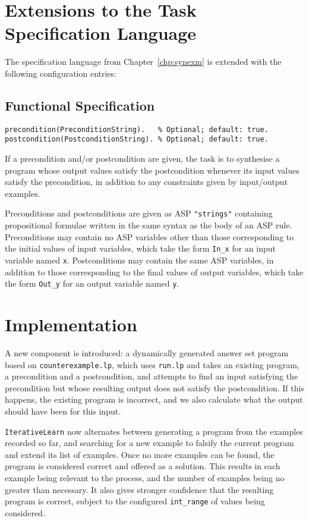 \documentclass[a4paper,twoside,notitlepage]{report}
\newcommand{\ttt}{\texttt}
\begin{document}
\section{Extensions to the Task Specification Language}
The specification language from Chapter~\ref{chp:synexm} is extended with 
the following configuration entries:

\subsection{Functional Specification}

\begin{Verbatim}[samepage=true]
precondition(PreconditionString).   % Optional; default: true.
postcondition(PostconditionString). % Optional; default: true.
\end{Verbatim}
If a precondition and/or postcondition are given, the task is to synthesise a 
program whose output values satisfy the postcondition whenever its input 
values satisfy the precondition, in addition to any constraints given by 
input/output examples.

Preconditions and postconditions are given as ASP \verb|"strings"|
containing propositional formulae written in the same syntax as the body of an 
ASP rule. Preconditions may contain no ASP variables other than those 
corresponding to the initial values of input variables, which take the form 
\ttt{In\_x} for an input variable named \ttt{x}. Postconditions may contain 
the same ASP variables, in addition to those corresponding to the final values 
of output variables, which take the form \ttt{Out\_y} for an output variable 
named \ttt{y}.

\section{Implementation}

A new component is introduced: a dynamically 
generated answer set program based on \verb|counterexample.lp|, which uses 
\verb|run.lp| and takes an existing program, a precondition and a 
postcondition, and attempts to find an input satisfying the precondition 
but whose resulting output does not satisfy the postcondition. If this 
happens, the existing program is incorrect, and we also calculate what the 
output should have been for this input.

\verb|IterativeLearn| now alternates between generating a program from the 
examples recorded so far, and searching for a new example to falsify the 
current program and extend its list of examples. Once no more examples can 
be found, the program is considered correct and offered as a solution. 
This results in each example being relevant to the process, and the number 
of examples being no greater than necessary. It also gives stronger 
confidence that the resulting program is correct, subject to the 
configured \verb|int_range| of values being considered.
\end{document}
